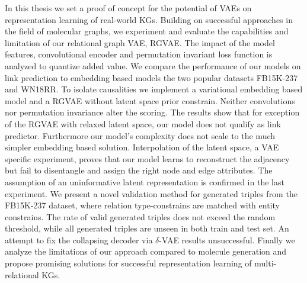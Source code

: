 \documentclass{article}
\begin{document}
In this thesis we set a proof of concept for the potential of VAEs on representation learning of real-world KGs. Building on successful approaches in the field of molecular graphs, we experiment and evaluate the capabilities and limitation of our relational graph VAE, RGVAE. The impact of the model features, convolutional encoder and permutation invariant loss function is analyzed to quantize added value. We compare the performance of our models on link prediction to embedding based models the two popular datasets FB15K-237 and WN18RR. To isolate causalities we implement a variational embedding based model and a RGVAE without latent space prior constrain. Neither convolutions nor permutation invariance alter the scoring. The results show that for exception of the RGVAE with relaxed latent space, our model does not qualify as link predictor. Furthermore our model's complexity does not scale to the much simpler embedding based solution.
Interpolation of the latent space, a VAE specific experiment, proves that our model learns to reconstruct the adjacency but fail to disentangle and assign the right node and edge attributes. The assumption of an uninformative latent representation is confirmed in the last experiment. We present a novel validation method for generated triples from the FB15K-237 dataset, where relation type-constrains are matched with entity constrains. The rate of valid generated triples does not exceed the random threshold, while all generated triples are unseen in both train and test set. An attempt to fix the collapsing decoder via $\delta$-VAE results unsuccessful. Finally we analyze the limitations of our approach compared to molecule generation and propose promising solutions for successful representation learning of multi-relational KGs. 

\end{document}
